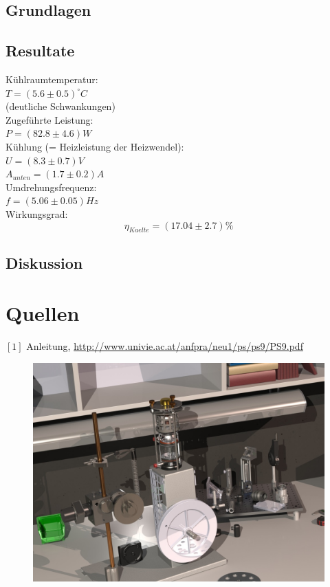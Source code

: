 \documentclass[12pt,a4paper]{article}
\begin{document}
\begin{multicols}{2}
\subsection{Grundlagen}


\subsection{Resultate}


Kühlraumtemperatur:\\ 
$T= (5.6 \pm 0.5)^{\circ}C$\\
\indent (deutliche Schwankungen)\\
Zugeführte Leistung:\\
$P=(82.8 \pm 4.6)W$\\
\noindent Kühlung (= Heizleistung der Heizwendel):\\ 
$U= (8.3 \pm 0.7)V$\\
$A_{unten} = (1.7 \pm 0.2)A$\\
\noindent Umdrehungsfrequenz:\\
$f = (5.06\pm 0.05)Hz$\\
Wirkungsgrad:\\
$$\eta_{Kaelte}=(17.04\pm 2.7)\%$$

\subsection{Diskussion}





\section{Quellen}
$[1]$ Anleitung, \url{http://www.univie.ac.at/anfpra/neu1/ps/ps9/PS9.pdf}\\

\end{multicols}

\begin{figure}[H]
	\centering
	\includegraphics[scale=2]{./data/3D-Model/PS9-model_desk01.JPG}
	\label{fig:stirlingMotor_3D-desktop}
\end{figure}
\end{document}
